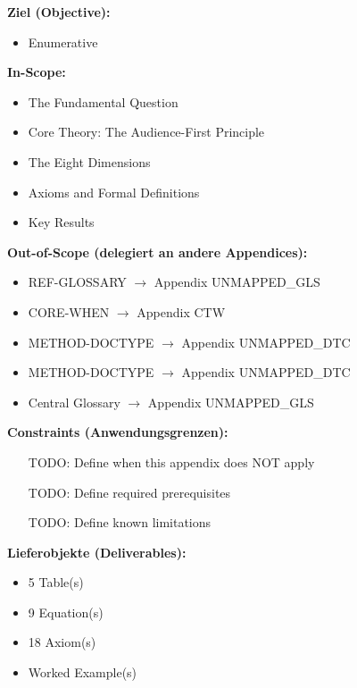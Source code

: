 \begin{tcolorbox}[
    colback=orange!5!white,
    colframe=orange!75!black,
    title={\textbf{Appendix Scope: Ziel / In-Scope / Out-of-Scope / Constraints}},
    fonttitle=\bfseries
]

\textbf{Ziel (Objective):}
\begin{itemize}[nosep]
    \item Enumerative
\end{itemize}

\textbf{In-Scope:}
\begin{itemize}[nosep]
    \item The Fundamental Question
    \item Core Theory: The Audience-First Principle
    \item The Eight Dimensions
    \item Axioms and Formal Definitions
    \item Key Results
\end{itemize}

\textbf{Out-of-Scope (delegiert an andere Appendices):}
\begin{itemize}[nosep]
    \item REF-GLOSSARY $\rightarrow$ Appendix UNMAPPED_GLS
    \item CORE-WHEN $\rightarrow$ Appendix CTW
    \item METHOD-DOCTYPE $\rightarrow$ Appendix UNMAPPED_DTC
    \item METHOD-DOCTYPE $\rightarrow$ Appendix UNMAPPED_DTC
    \item Central Glossary $\rightarrow$ Appendix UNMAPPED_GLS
\end{itemize}

\textbf{Constraints (Anwendungsgrenzen):}
\begin{itemize}[nosep]
    \item [TODO: Define when this appendix does NOT apply]
    \item [TODO: Define required prerequisites]
    \item [TODO: Define known limitations]
\end{itemize}

\textbf{Lieferobjekte (Deliverables):}
\begin{itemize}[nosep]
    \item 5 Table(s)
    \item 9 Equation(s)
    \item 18 Axiom(s)
    \item Worked Example(s)
\end{itemize}

\end{tcolorbox}




